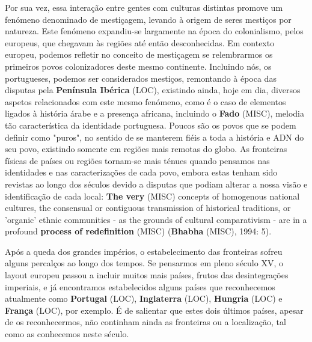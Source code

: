\documentclass[12pt,a4paper]{article}
\begin{document}
Por sua vez,  essa interação entre gentes  com  culturas distintas  promove um  fenómeno denominado  de  mestiçagem,  levando  à  origem  de  seres  mestiços  por  natureza.  Este fenómeno  expandiu-se  largamente  na  época  do  colonialismo,  pelos  europeus,  que chegavam às regiões até então desconhecidas. Em contexto europeu, podemos refletir no conceito de mestiçagem se relembrarmos os primeiros povos colonizadores deste mesmo continente.  Incluindo  nós,  os  portugueses,  podemos  ser  considerados  mestiços, remontando  à  época  das  disputas  pela  \textbf{Península  Ibérica} (LOC),  existindo  ainda,  hoje  em  dia, diversos aspetos relacionados com este mesmo fenómeno, como é o caso de elementos ligados à história árabe e a presença africana, incluindo o \textbf{Fado} (MISC), melodia tão característica da identidade portuguesa. Poucos são os povos que se podem definir como "puros", no sentido de se manterem fiéis a toda a história e ADN do seu povo, existindo somente em regiões mais remotas do globo. As fronteiras físicas de países ou regiões tornam-se mais ténues quando pensamos nas identidades e nas caracterizações de cada povo, embora estas tenham sido revistas ao longo dos séculos devido a disputas que podiam alterar a nossa visão e identificação de cada local: \textbf{The  very} (MISC)  concepts  of  homogenous  national  cultures,  the  consensual  or  contiguous transmission of historical traditions, or 'organic' ethnic communities - as the grounds of cultural comparativism - are in a profound \textbf{process of redefinition} (MISC) (\textbf{Bhabha} (MISC), 1994: 5).

Após a queda dos grandes impérios, o estabelecimento das fronteiras sofreu alguns percalços  ao  longo  dos  tempos.  Se  pensarmos  em  pleno  século  XV,  o layout europeu passou a incluir muitos mais países, frutos das desintegrações imperiais, e já encontramos estabelecidos  alguns  países  que  reconhecemos  atualmente  como  \textbf{Portugal} (LOC),  \textbf{Inglaterra} (LOC), \textbf{Hungria} (LOC) e \textbf{França} (LOC), por exemplo. É de salientar que estes dois últimos países, apesar de os reconhecermos,  não  continham  ainda  as  fronteiras  ou  a  localização,  tal  como  as conhecemos neste século.
\end{document}
